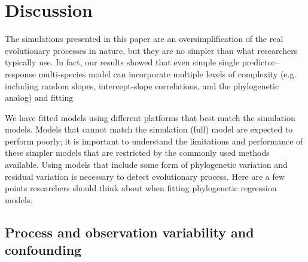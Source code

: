 \documentclass[12pt]{article}
\begin{document}

\newpage

\section*{Discussion}



The simulations presented in this paper are an oversimplification of the real evolutionary processes in nature, but they are no simpler than what researchers typically use.
In fact, our results showed that even simple single predictor--response multi-species model can incorporate multiple levels of complexity (e.g. including random slopes, intercept-slope correlations, and the phylogenetic analog) and fitting 


We have fitted models using different platforms that best match the simulation models. 
Models that cannot match the simulation (full) model are expected to perform poorly; it is important to understand the limitations and performance of these simpler models that are restricted by the commonly used methods available.
Using models that include some form of phylogenetic variation and residual variation is necessary to detect evolutionary process.
Here are a few points researchers should think about when fitting phylogenetic regression models.

\subsection{Process and observation variability and confounding}
\end{document}
